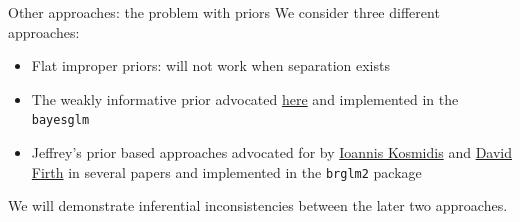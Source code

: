 \documentclass[
  ignorenonframetext,
]{beamer}
\providecommand{\tightlist}{%
  \setlength{\itemsep}{0pt}\setlength{\parskip}{0pt}}
\begin{document}
\begin{frame}{Other approaches: the problem with priors}
\protect\hypertarget{other-approaches-the-problem-with-priors}{}
We consider three different approaches:

\begin{itemize}
\tightlist
\item
  Flat improper priors: will not work when separation exists
\item
  The weakly informative prior advocated
  \href{https://projecteuclid.org/journals/annals-of-applied-statistics/volume-2/issue-4/A-weakly-informative-default-prior-distribution-for-logistic-and-other/10.1214/08-AOAS191.full}{here}
  and implemented in the \texttt{bayesglm}
\item
  Jeffrey's prior based approaches advocated for by
  \href{https://www.ikosmidis.com/}{Ioannis Kosmidis} and
  \href{https://warwick.ac.uk/fac/sci/statistics/staff/academic-research/firth/}{David
  Firth} in several papers and implemented in the \texttt{brglm2}
  package
\end{itemize}

We will demonstrate inferential inconsistencies between the later two
approaches.
\end{frame}
\end{document}
